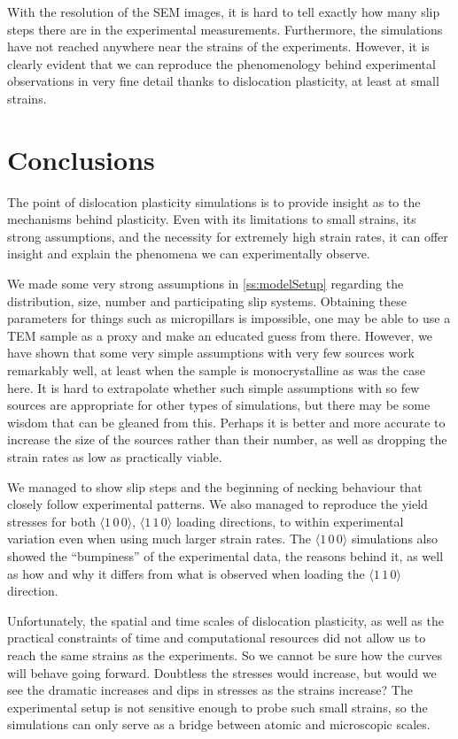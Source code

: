 With the resolution of the SEM images, it is hard to tell exactly how many slip steps there are in the experimental measurements. Furthermore, the simulations have not reached anywhere near the strains of the experiments. However, it is clearly evident that we can reproduce the phenomenology behind experimental observations in very fine detail thanks to dislocation plasticity, at least at small strains.

\section{Conclusions}
\label{s:concSim}

The point of dislocation plasticity simulations is to provide insight as to the mechanisms behind plasticity. Even with its limitations to small strains, its strong assumptions, and the necessity for extremely high strain rates, it can offer insight and explain the phenomena we can experimentally observe.

We made some very strong assumptions in \cref{ss:modelSetup} regarding the distribution, size, number and participating slip systems. Obtaining these parameters for things such as micropillars is impossible, one may be able to use a TEM sample as a proxy and make an educated guess from there. However, we have shown that some very simple assumptions with very few sources work remarkably well, at least when the sample is monocrystalline as was the case here. It is hard to extrapolate whether such simple assumptions with so few sources are appropriate for other types of simulations, but there may be some wisdom that can be gleaned from this. Perhaps it is better and more accurate to increase the size of the sources rather than their number, as well as dropping the strain rates as low as practically viable.

We managed to show slip steps and the beginning of necking behaviour that closely follow experimental patterns. We also managed to reproduce the yield stresses for both $\langle 1\, 0\, 0 \rangle$, $\langle 1\, 1\, 0 \rangle$ loading directions, to within experimental variation even when using much larger strain rates. The $\langle 1\, 0\, 0 \rangle$ simulations also showed the ``bumpiness'' of the experimental data, the reasons behind it, as well as how and why it differs from what is observed when loading the $\langle 1\, 1\, 0 \rangle$ direction.

Unfortunately, the spatial and time scales of dislocation plasticity, as well as the practical constraints of time and computational resources did not allow us to reach the same strains as the experiments. So we cannot be sure how the curves will behave going forward. Doubtless the stresses would increase, but would we see the dramatic increases and dips in stresses as the strains increase? The experimental setup is not sensitive enough to probe such small strains, so the simulations can only serve as a bridge between atomic and microscopic scales.

